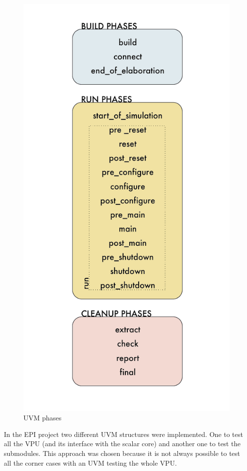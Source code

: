 \begin{figure}[H]
    \centering
    \includegraphics[scale = 0.6]{Chapter_1/img/phases-uvm.png}
    \caption{UVM phases}
    \label{phases-uvm}
\end{figure}


In the EPI project two different UVM structures were implemented. One to test all the VPU (and its interface with the scalar core) and another one to test the submodules. This approach was chosen because it is not always possible to test all the corner cases with an UVM testing the whole VPU.

